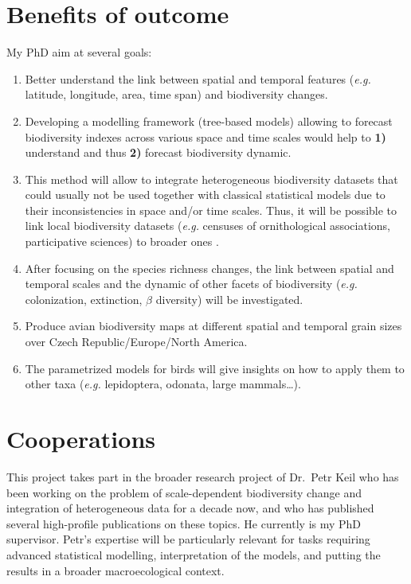\documentclass[
  12pt,
  oneside]{report}
\begin{document}
\hypertarget{benefits}{%
\chapter{Benefits of outcome}\label{benefits}}

My PhD aim at several goals:

\begin{enumerate}
\def\labelenumi{\arabic{enumi}.}
\item
  Better understand the link between spatial and temporal features (\emph{e.g.} latitude, longitude, area, time span) and biodiversity changes.
\item
  Developing a modelling framework (tree-based models) allowing to forecast biodiversity indexes across various space and time scales would help to \textbf{1)} understand and thus \textbf{2)} forecast biodiversity dynamic.
\item
  This method will allow to integrate heterogeneous biodiversity datasets that could usually not be used together with classical statistical models due to their inconsistencies in space and/or time scales. Thus, it will be possible to link local biodiversity datasets (\emph{e.g.} censuses of ornithological associations, participative sciences) to broader ones \autocite[\emph{e.g.} atlas, time-series assemblage such as Biotime database by][]{dornelas_biotime_2018}.
\item
  After focusing on the species richness changes, the link between spatial and temporal scales and the dynamic of other facets of biodiversity (\emph{e.g.} colonization, extinction, \(\beta\) diversity) will be investigated.
\item
  Produce avian biodiversity maps at different spatial and temporal grain sizes over Czech Republic/Europe/North America.
\item
  The parametrized models for birds will give insights on how to apply them to other taxa (\emph{e.g.} lepidoptera, odonata, large mammals\ldots).
\end{enumerate}

\hypertarget{coop}{%
\chapter{Cooperations}\label{coop}}

This project takes part in the broader research project of Dr.~Petr Keil who has been working on the problem of scale-dependent biodiversity change and integration of heterogeneous data for a decade now, and who has published several high-profile publications on these topics. He currently is my PhD supervisor. Petr's expertise will be particularly relevant for tasks requiring advanced statistical modelling, interpretation of the models, and putting the results in a broader macroecological context.
\end{document}

